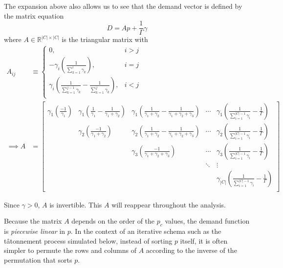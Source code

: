 \documentclass[12pt]{article}
\theoremstyle{definition}
\begin{document}
The expansion above also allows us to see that the demand vector is defined by the matrix equation
\begin{equation}D = A p + \frac{1}{\Gamma}\gamma \label{demandmatrixeq}\end{equation}
where $A\in \mathbb{R}^{|C| \times |C|}$ is the triangular matrix with
\begin{align} \label{Adef}
A_{ij} &\equiv \begin{cases}
0, & i > j \\
-\gamma_i \left(\frac{1}{ \sum_{k=1}^i \gamma_k}\right), & i=j \\
\gamma_i \left( \frac{1}{\sum_{k=1}^{j-1} \gamma_k} -  \frac{1}{\sum_{k=1}^{j} \gamma_k}\right), & i<j \\
\end{cases} \\[.8em]
\implies A &= \begin{bmatrix}
\gamma_1 \left( \frac{-1}{\gamma_1} \right) & \gamma_1 \left(\frac{1}{\gamma_1} - \frac{1}{\gamma_1 + \gamma_2} \right) & \gamma_1 \left(\frac{1}{\gamma_1 + \gamma_2} - \frac{1}{\gamma_1 + \gamma_2 + \gamma_3} \right) & \cdots &  \gamma_1 \left(\frac{1}{\sum_{i=1}^{|C| - 1}\gamma_i} - \frac{1}{\Gamma}  \right)  \\
 & \gamma_2 \left( \frac{-1}{\gamma_1 + \gamma_2} \right) & \gamma_2 \left(\frac{1}{\gamma_1 + \gamma_2} - \frac{1}{\gamma_1 + \gamma_2 + \gamma_3} \right) & \cdots &  \gamma_2 \left(\frac{1}{\sum_{i=1}^{|C| - 1}\gamma_i} - \frac{1}{\Gamma} \right)  \\
 &  & \gamma_3 \left( \frac{-1}{\gamma_1 + \gamma_2 + \gamma_3} \right) & \cdots &  \gamma_3 \left(\frac{1}{\sum_{i=1}^{|C| - 1}\gamma_i} - \frac{1}{\Gamma} \right)  \\
 & & & \ddots & \vdots \\
 &  &  &  &  \gamma_{|C|} \left(\frac{1}{\sum_{i=1}^{|C| - 1}\gamma_i} -\frac{1}{\Gamma}  \right)  \\
\end{bmatrix}\end{align}

Since $\gamma > 0$, $A$ is invertible. This $A$ will reappear throughout the analysis. 

Because the matrix $A$ depends on the order of the $p_c$ values, the demand function is \emph{piecewise linear} in $p$. In the context of an iterative schema such as the t\^{a}tonnement process simulated below, instead of sorting $p$ itself, it is often simpler to permute the rows and columns of $A$ according to the inverse of the permutation that sorts $p$.
\end{document}
